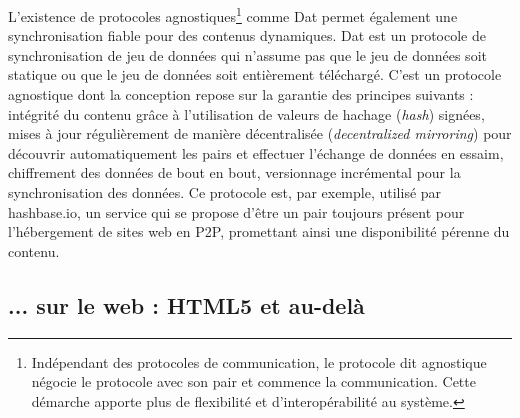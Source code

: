 L'existence de protocoles agnostiques\footnote{Indépendant des 
protocoles de communication, le protocole dit \og agnostique\fg{} négocie le 
protocole avec son pair et commence la communication. Cette démarche 
apporte plus de flexibilité et d'interopérabilité au système.} comme Dat 
\cite{Ogden2017} permet également une synchronisation fiable pour des 
contenus dynamiques. Dat est un protocole de synchronisation de jeu de données 
qui n'assume pas que le jeu de données soit statique ou que le jeu de données 
soit entièrement téléchargé. C'est un protocole agnostique dont la conception 
repose sur la garantie des principes suivants : intégrité du contenu grâce à 
l'utilisation de valeurs de hachage (\textit{hash}) signées, mises à jour 
régulièrement de manière décentralisée (\textit{decentralized mirroring}) pour 
découvrir automatiquement les pairs et effectuer l'échange de données en 
essaim, chiffrement des données de bout en bout, versionnage incrémental pour la 
synchronisation des données. Ce protocole est, par exemple, utilisé par 
hashbase.io, un service qui se propose d'être un pair toujours présent pour 
l'hébergement de sites web en \gls{P2P}, promettant ainsi une disponibilité 
pérenne du contenu. 


\subsection{... sur le web : HTML5 et au-delà}

